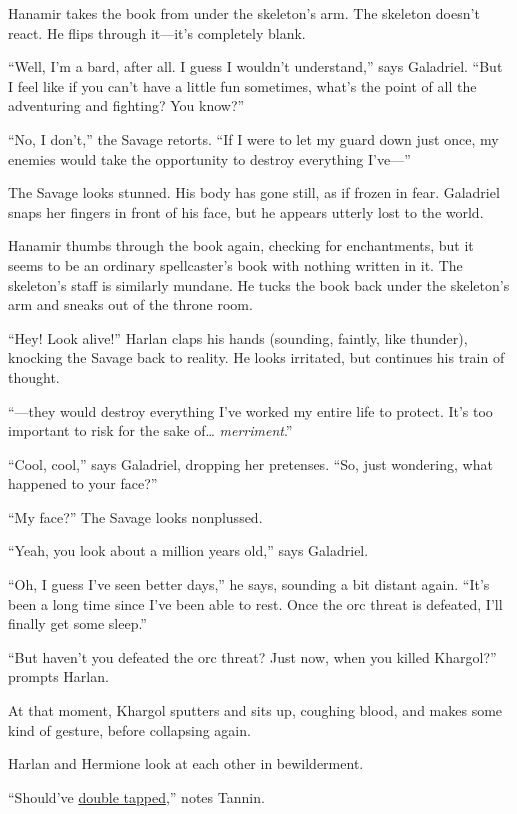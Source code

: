 \documentclass[smalldemyvopaper,11pt,twoside,onecolumn,openright,extrafontsizes]{memoir}
\newlength\drop
\begin{document}
Hanamir takes the book from under the skeleton's arm. The skeleton
doesn't react. He flips through it---it's completely blank.

``Well, I'm a bard, after all. I guess I wouldn't understand,'' says
Galadriel. ``But I feel like if you can't have a little fun sometimes,
what's the point of all the adventuring and fighting? You know?''

``No, I don't,'' the Savage retorts. ``If I were to let my guard down
just once, my enemies would take the opportunity to destroy everything
I've---''

The Savage looks stunned. His body has gone still, as if frozen in fear.
Galadriel snaps her fingers in front of his face, but he appears utterly
lost to the world.

Hanamir thumbs through the book again, checking for enchantments, but it
seems to be an ordinary spellcaster's book with nothing written in it.
The skeleton's staff is similarly mundane. He tucks the book back under
the skeleton's arm and sneaks out of the throne room.

``Hey! Look alive!'' Harlan claps his hands (sounding, faintly, like
thunder), knocking the Savage back to reality. He looks irritated, but
continues his train of thought.

``---they would destroy everything I've worked my entire life to
protect. It's too important to risk for the sake of\ldots{}
\emph{merriment}.''

``Cool, cool,'' says Galadriel, dropping her pretenses. ``So, just
wondering, what happened to your face?''

``My face?'' The Savage looks nonplussed.

``Yeah, you look about a million years old,'' says Galadriel.

``Oh, I guess I've seen better days,'' he says, sounding a bit distant
again. ``It's been a long time since I've been able to rest. Once the
orc threat is defeated, I'll finally get some sleep.''

``But haven't you defeated the orc threat? Just now, when you killed
Khargol?'' prompts Harlan.

At that moment, Khargol sputters and sits up, coughing blood, and makes
some kind of gesture, before collapsing again.

Harlan and Hermione look at each other in bewilderment.

``Should've
\href{http://tvtropes.org/pmwiki/pmwiki.php/Main/DoubleTap}{double
tapped},'' notes Tannin.
\end{document}
